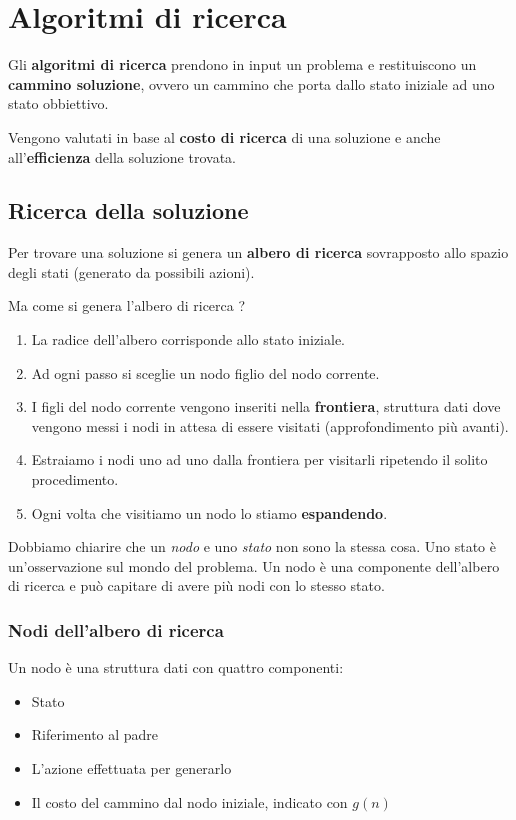 \chapter{Algoritmi di ricerca}
Gli \textbf{algoritmi di ricerca} prendono in input un problema e restituiscono un
\textbf{cammino soluzione}, ovvero un cammino che porta dallo stato iniziale ad uno stato
obbiettivo.

Vengono valutati in base al \textbf{costo di ricerca} di una soluzione e anche
all'\textbf{efficienza} della soluzione trovata.

\section{Ricerca della soluzione}
Per trovare una soluzione si genera un \textbf{albero di ricerca} sovrapposto allo spazio
degli stati (generato da possibili azioni).

Ma come si genera l'albero di ricerca ?
\begin{enumerate}
	\item La radice dell'albero corrisponde allo stato iniziale.
	\item Ad ogni passo si sceglie un nodo figlio del nodo corrente.
	\item I figli del nodo corrente vengono inseriti nella \textbf{frontiera}, struttura
	      dati dove vengono messi i nodi in attesa di essere visitati (approfondimento
	      pi\`u avanti).
	\item Estraiamo i nodi uno ad uno dalla frontiera per visitarli ripetendo il solito
	      procedimento.
	\item Ogni volta che visitiamo un nodo lo stiamo \textbf{espandendo}.
\end{enumerate}
Dobbiamo chiarire che un \emph{nodo} e uno \emph{stato} non sono la stessa cosa. Uno stato
\`e un'osservazione sul mondo del problema. Un nodo \`e una componente dell'albero di
ricerca e pu\`o capitare di avere pi\`u nodi con lo stesso stato.

\subsection{Nodi dell'albero di ricerca}
Un nodo \`e una struttura dati con quattro componenti:
\begin{itemize}
	\item Stato
	\item Riferimento al padre
	\item L'azione effettuata per generarlo
	\item Il costo del cammino dal nodo iniziale, indicato con $g(n)$
\end{itemize}

